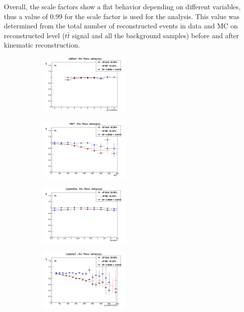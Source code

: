 Overall, the scale factors 
show a flat behavior depending on different variables, thus a value of 0.99 for the scale factor is used for the analysis. This value was determined 
from the total number of reconstructed events in data and MC on reconstructed level ($t\bar{t}$ signal and all the background samples) before and
after kinematic reconstruction.

\begin{figure}[t]
\centering
\begin{subfigure}
  \centering
  \includegraphics[width=0.49\textwidth]{05_kinReco/plots/eff_SF/KinRecoEff_JetMult.png}
\end{subfigure}
\begin{subfigure}
  \centering
  \includegraphics[width=0.49\textwidth]{05_kinReco/plots/eff_SF/KinRecoEff_MET.png}
\end{subfigure}
\begin{subfigure}
  \centering
  \includegraphics[width=0.49\textwidth]{05_kinReco/plots/eff_SF/KinRecoEff_LeptonEta.png}
\end{subfigure}
\begin{subfigure}
  \centering
  \includegraphics[width=0.49\textwidth]{05_kinReco/plots/eff_SF/KinRecoEff_LeptonpT.png}

\end{subfigure}
\end{figure}
